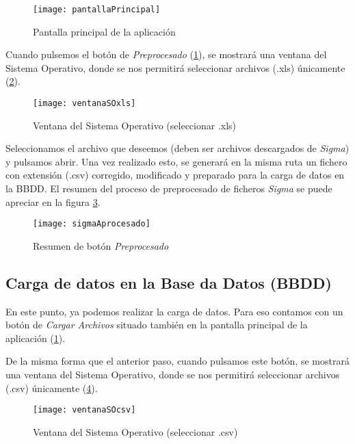 \begin{figure}%
		\centering
		\texttt{[image: pantallaPrincipal]}
		\caption{Pantalla principal de la aplicación}\label{fig:pantallaPrincipal}
	\end{figure}


Cuando pulsemos el botón de \emph{Preprocesado} (\ref{fig:pantallaPrincipal}), se mostrará una ventana del Sistema Operativo, donde se nos permitirá seleccionar archivos (.xls) únicamente (\ref{fig:ventanaSOxls}).


\begin{figure}%
		\centering
		\texttt{[image: ventanaSOxls]}
		\caption{Ventana del Sistema Operativo (seleccionar .xls)}\label{fig:ventanaSOxls}
	\end{figure}


Seleccionamos el archivo que deseemos (deben ser archivos descargados de \emph{Sigma}) y pulsamos abrir.
Una vez realizado esto, se generará en la misma ruta un fichero con extensión (.csv) corregido, modificado y preparado para la carga de datos en la BBDD. El resumen del proceso de preprocesado de ficheros \emph{Sigma} se puede apreciar en la figura  \ref{fig:sigmaAprocesado}.

\begin{figure}%
		\centering
		\texttt{[image: sigmaAprocesado]}
		\caption{Resumen de botón \emph{Preprocesado}}\label{fig:sigmaAprocesado}
	\end{figure}


\subsection{Carga de datos en la Base da Datos (BBDD)}

En este punto, ya podemos realizar la carga de datos. Para eso contamos con un botón de \emph{Cargar Archivos} situado también en la pantalla principal de la aplicación (\ref{fig:pantallaPrincipal}).

De la misma forma que el anterior paso, cuando pulsamos este botón, se mostrará una ventana del Sistema Operativo, donde se nos permitirá seleccionar archivos (.csv) únicamente (\ref{fig:ventanaSOcsv}).

\begin{figure}%
		\centering
		\texttt{[image: ventanaSOcsv]}
		\caption{Ventana del Sistema Operativo (seleccionar .csv)}\label{fig:ventanaSOcsv}
	\end{figure}


